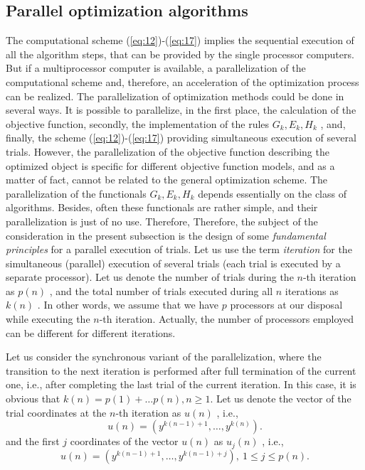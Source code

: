 \subsection {Parallel optimization algorithms}
\label {subsec:1.2.2}
The computational scheme (\ref{eq:12})-(\ref{eq:17}) implies  the sequential execution of all the algorithm steps, that can be provided by the single processor computers. But if a multiprocessor computer is available, a parallelization of the computational scheme and, therefore, an acceleration of the optimization process can be realized. The parallelization of optimization methods could be done in several ways. It is possible to parallelize, in the first place, the calculation of the objective function, secondly, the implementation of the rules $G_k,E_k,H_k$ , and, finally, the scheme (\ref{eq:12})-(\ref{eq:17}) providing simultaneous execution of several trials. However, the parallelization of the objective function describing the optimized object is specific for different objective function models, and as a matter of fact, cannot be related to the general optimization scheme. The parallelization of the functionals  $G_k,E_k,H_k$ depends essentially on the class of algorithms. Besides, often these functionals are rather simple, and their parallelization is just of no use. Therefore, Therefore, the subject of the consideration in the present subsection  is the design of some \textit {fundamental principles} for a parallel execution of trials.  Let us use the term \textit {iteration} for the simultaneous (parallel) execution of several trials (each trial is executed by a separate processor). Let us denote the number of trials during the $n$-th iteration as $p(n)$ , and the total number of trials executed during all $n$ iterations as $k(n)$ . In other words, we assume that we have  $p$  processors at our disposal while executing the $n$-th iteration. Actually, the number of processors employed can be different for different iterations. 

Let us consider the synchronous variant of the parallelization, where the transition to the next iteration is performed after full termination of the current one, i.e., after completing the last trial of the current iteration. In this case, it is obvious that $k(n)=p(1)+\ldots p(n),n\geq 1$.  Let us denote the vector of the trial coordinates at the $n$-th iteration as $u(n)$ , i.e.,
\begin{displaymath}
u(n)=(y^{k(n-1)+1},\ldots ,y^{k(n)}) .
\end{displaymath}
and the first $j$ coordinates of the vector $u(n)$  as $u_j(n)$ , i.e., 
\begin{displaymath}
u(n)=(y^{k(n-1)+1},\ldots ,y^{k(n-1)+j}),\ 1\leq j\leq p(n) .
\end{displaymath}

